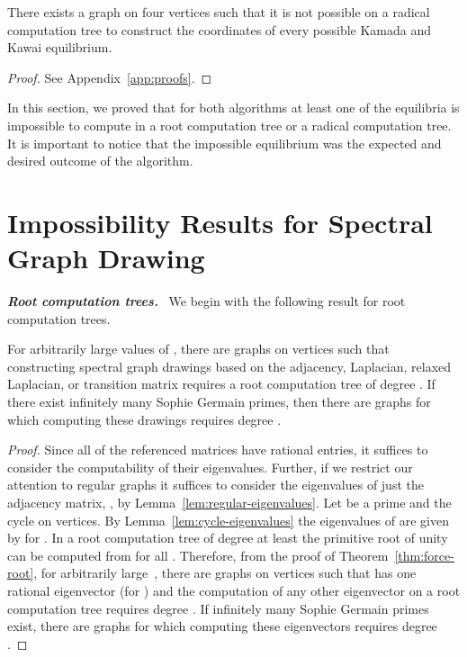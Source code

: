 \documentclass[oribibl,10pt]{llncs}
\newcommand{\Emph}[1]{\smallskip\textbf{\textit{#1}}~}
\begin{document}
\begin{theorem}
\label{thm:kk-radical}
There exists a graph on four vertices such that it is not possible on a radical computation tree to construct the coordinates of every possible Kamada and Kawai equilibrium.
\end{theorem}
\begin{proof}
See Appendix~\ref{app:proofs}.
\end{proof}

\ifFull
In this section, we proved that for both algorithms at least one of the equilibria is impossible to compute in a root computation tree or a radical computation tree. 
It is important to notice that the impossible equilibrium was the expected and desired outcome of the algorithm.
\fi

\section{Impossibility Results for Spectral Graph Drawing}
\Emph{Root computation trees.}
We begin with the following result for root computation trees.

\begin{theorem}
For arbitrarily large values of , there are graphs on  vertices such that constructing spectral graph drawings based on the adjacency, Laplacian, relaxed Laplacian, or transition matrix requires a root computation tree of degree . If there exist infinitely many Sophie Germain primes, then there are graphs for which computing these drawings requires degree .
\end{theorem}

\begin{proof}
Since all of the referenced matrices have rational entries, it suffices to consider the computability of their eigenvalues. 
Further, if we restrict our attention to regular graphs it suffices to consider the eigenvalues of just the adjacency matrix, 
, by Lemma~\ref{lem:regular-eigenvalues}. Let  be a prime and  the cycle on  vertices. By Lemma~\ref{lem:cycle-eigenvalues} the eigenvalues of  are given by  for .
In a root computation tree of degree at least  the primitive root of unity  can be computed from  for all . 
Therefore, from the proof of Theorem~\ref{thm:force-root},
for arbitrarily large~, 
there are graphs on  vertices such that  has one rational eigenvector (for ) and 
the computation of any other eigenvector on a root computation tree requires degree .
If infinitely many Sophie Germain primes exist, there are graphs for which computing these eigenvectors requires degree .
\end{proof}
\end{document}
